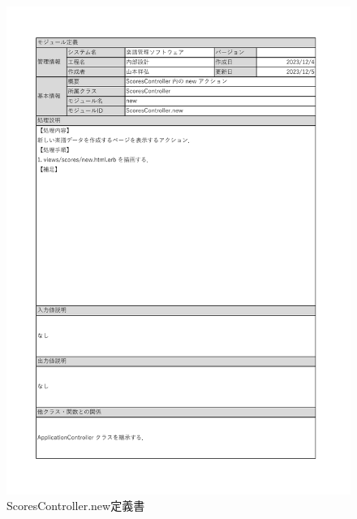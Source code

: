 \begin{figure}
    \centering
    \includegraphics[scale=0.7]{img/Scores/xlsx/ScoresController_new.pdf}
    \caption{ScoresController.new定義書}
\end{figure}
